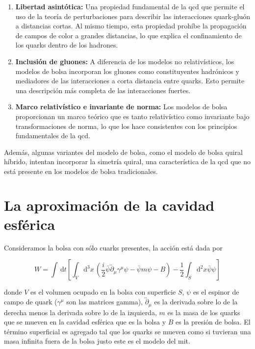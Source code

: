\renewcommand{\labelenumi}{\alph{enumi})}

\begin{enumerate}
\item \textbf{Libertad asintótica:} Una propiedad fundamental de la \acrshort{qcd} que permite el uso de la teoría de perturbaciones para describir las interacciones quark-gluón a distancias cortas. Al mismo tiempo, esta propiedad prohíbe la propagación de campos de color a grandes distancias, lo que explica el confinamiento de los quarks dentro de los hadrones. %
\item \textbf{Inclusión de gluones:}  A diferencia de los modelos no relativísticos, los modelos de bolsa incorporan los gluones como constituyentes hadrónicos y mediadores de las interacciones a corta distancia entre quarks. Esto permite una descripción más completa de las interacciones fuertes. %
\item \textbf{Marco relativístico e invariante de norma:} Los modelos de bolsa proporcionan un marco teórico que es tanto relativístico como invariante bajo transformaciones de norma, lo que los hace consistentes con los principios fundamentales de la \acrshort{qcd}. %

\end{enumerate}

Además, algunas variantes del modelo de bolsa, como el modelo de bolsa quiral híbrido, intentan incorporar la simetría quiral, una característica de la \acrshort{qcd} que no está presente en los modelos de bolsa tradicionales.%

\section{La aproximación de la cavidad esférica}

Consideramos la bolsa con sólo cuarks presentes, la acción está dada por

\begin{equation}\label{eq-action}
W = \int \, \mathrm{d}t \left[ \int_{V} \mathrm{d}^{3} x \, \left( \frac{i}{2} \bar{\psi} \overleftrightarrow{\partial}_{\mu} {\gamma}^{\mu} \psi - \bar{\psi} m \psi - B \right) - \frac{1}{2} \int_{S} \mathrm{d}^{2} x \bar{\psi} \psi\right]
\end{equation}

donde $V$ es el volumen ocupado en la bolsa con superficie $S$, $\psi$ es el espinor de campo de quark (${\gamma}^{\mu}$ son las matrices gamma), $\overleftrightarrow{\partial}_{\mu}$ es la derivada sobre lo de la derecha menos la derivada sobre lo de la izquierda, $m$ es la masa de los quarks que se mueven en la cavidad esférica que es la bolsa y $B$ es la presión de bolsa. El término superficial es agregado tal que los quarks se mueven como si tuvieran una masa infinita fuera de la bolsa justo este es el modelo del \acrshort{mit}.

